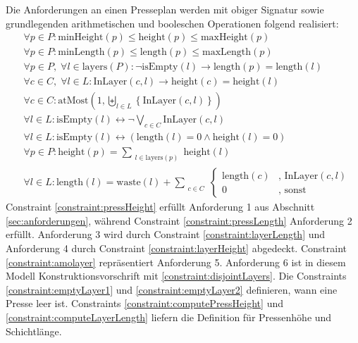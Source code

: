 Die Anforderungen an einen Presseplan werden mit obiger Signatur sowie grundlegenden arithmetischen und booleschen Operationen folgend realisiert:
\begin{align}
    & \forall p \in P: \text{minHeight}(p) \leq \text{height}(p) \leq \text{maxHeight}(p) \label{constraint:pressHeight} \\[10pt]
    & \forall p \in P: \text{minLength}(p) \leq \text{length}(p) \leq \text{maxLength}(p) \label{constraint:pressLength} \\[10pt]
    & \forall p \in P,\; \forall l \in \text{layers}(P): \neg \text{isEmpty}(l) \rightarrow \text{length}(p) = \text{length}(l) \label{constraint:layerLength} \\[10pt]
    & \forall c \in C,\; \forall l \in L: \text{InLayer}(c,l) \rightarrow \text{height}(c) = \text{height}(l) \label{constraint:layerHeight} \\[10pt]
    & \forall c \in C: \text{atMost}\left(1, \biguplus_{l \in L} \left\{ \text{InLayer}(c,l) \right\}\right) \label{constraint:amolayer} \\[10pt]
    & \forall l \in L: \text{isEmpty}(l) \leftrightarrow \neg\bigvee_{c \in C} \text{InLayer}(c,l) \label{constraint:emptyLayer1} \\[10pt]
    & \forall l \in L: \text{isEmpty}(l) \leftrightarrow (\text{length}(l) = 0 \land \text{height}(l) = 0) \label{constraint:emptyLayer2} \\[10pt]
    & \forall p \in P: \text{height}(p) = \sum_{\substack{l \in \text{layers}(p)}} \text{height}(l) \label{constraint:computePressHeight} \\[10pt]
    & \forall l \in L: \text{length}(l) = \text{waste}(l) + \sum_{\substack{c \in C}}
    \begin{cases}
        \text{length}(c) & \text{, } \text{InLayer}(c,l) \\
        0 & \text{, sonst}
    \end{cases} \label{constraint:computeLayerLength}
\end{align}
Constraint \ref{constraint:pressHeight} erfüllt Anforderung 1 aus Abschnitt \ref{sec:anforderungen}, während Constraint \ref{constraint:pressLength} Anforderung 2 erfüllt.
Anforderung 3 wird durch Constraint \ref{constraint:layerLength} und Anforderung 4 durch Constraint \ref{constraint:layerHeight} abgedeckt.
Constraint \ref{constraint:amolayer} repräsentiert Anforderung 5.
Anforderung 6 ist in diesem Modell Konstruktionsvorschrift mit \ref{constraint:disjointLayers}.
Die Constraints \ref{constraint:emptyLayer1} und \ref{constraint:emptyLayer2} definieren, wann eine Presse leer ist.
Constraints \ref{constraint:computePressHeight} und \ref{constraint:computeLayerLength} liefern die Definition für Pressenhöhe und Schichtlänge.

